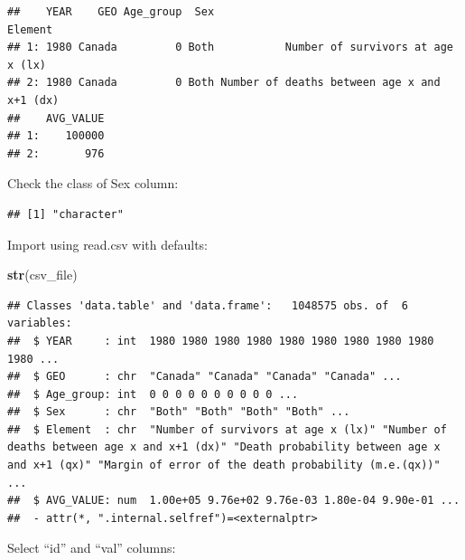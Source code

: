 \documentclass[]{book}
\newenvironment{Shaded}{\begin{snugshade}}{\end{snugshade}}
\newcommand{\DataTypeTok}[1]{\textcolor[rgb]{0.13,0.29,0.53}{#1}}
\newcommand{\DecValTok}[1]{\textcolor[rgb]{0.00,0.00,0.81}{#1}}
\newcommand{\KeywordTok}[1]{\textcolor[rgb]{0.13,0.29,0.53}{\textbf{#1}}}
\newcommand{\NormalTok}[1]{#1}
\newcommand{\OperatorTok}[1]{\textcolor[rgb]{0.81,0.36,0.00}{\textbf{#1}}}
\newcommand{\StringTok}[1]{\textcolor[rgb]{0.31,0.60,0.02}{#1}}
\begin{document}
\begin{verbatim}
##    YEAR    GEO Age_group  Sex                                     Element
## 1: 1980 Canada         0 Both           Number of survivors at age x (lx)
## 2: 1980 Canada         0 Both Number of deaths between age x and x+1 (dx)
##    AVG_VALUE
## 1:    100000
## 2:       976
\end{verbatim}

Check the class of Sex column:

\begin{Shaded}
\end{Shaded}

\begin{verbatim}
## [1] "character"
\end{verbatim}

Import using read.csv with defaults:

\begin{Shaded}
\begin{Highlighting}[]
\KeywordTok{str}\NormalTok{(csv_file)}
\end{Highlighting}
\end{Shaded}

\begin{verbatim}
## Classes 'data.table' and 'data.frame':	1048575 obs. of  6 variables:
##  $ YEAR     : int  1980 1980 1980 1980 1980 1980 1980 1980 1980 1980 ...
##  $ GEO      : chr  "Canada" "Canada" "Canada" "Canada" ...
##  $ Age_group: int  0 0 0 0 0 0 0 0 0 0 ...
##  $ Sex      : chr  "Both" "Both" "Both" "Both" ...
##  $ Element  : chr  "Number of survivors at age x (lx)" "Number of deaths between age x and x+1 (dx)" "Death probability between age x and x+1 (qx)" "Margin of error of the death probability (m.e.(qx))" ...
##  $ AVG_VALUE: num  1.00e+05 9.76e+02 9.76e-03 1.80e-04 9.90e-01 ...
##  - attr(*, ".internal.selfref")=<externalptr>
\end{verbatim}

Select ``id'' and ``val'' columns:

\begin{Shaded}
\end{Shaded}
\end{document}
